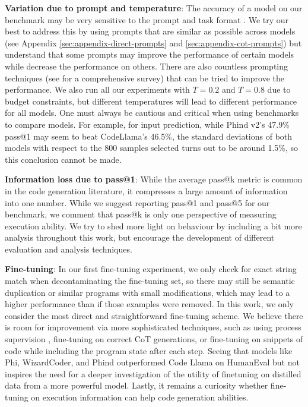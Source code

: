 \textbf{Variation due to prompt and temperature}: The accuracy of a model on our benchmark may be very sensitive to the prompt and task format \citep{mizrahi2023state}. We try our best to address this by using prompts that are similar as possible across models (see Appendix \ref{sec:appendix-direct-prompts} and \ref{sec:appendix-cot-prompts}) but understand that some prompts may improve the performance of certain models while decrease the performance on others. There are also countless prompting techniques (see \citep{liu2023pre} for a comprehensive survey) that can be tried to improve the performance. We also run all our experiments with $T=0.2$ and $T=0.8$ due to budget constraints, but different temperatures will lead to different performance for all models. One must always be cautious and critical when using benchmarks to compare models. For example, for input prediction, while Phind v2's 47.9\% pass@1 may seem to beat CodeLlama's 46.5\%, the standard deviations of both models with respect to the $800$ samples selected turns out to be around 1.5\%, so this conclusion cannot be made.

\textbf{Information loss due to pass@1}: While the average pass@k metric is common in the code generation literature, it compresses a large amount of information into one number. While we suggest reporting pass@1 and pass@5 for our benchmark, we comment that pass@k is only one perspective of measuring execution ability. We try to shed more light on behaviour by including a bit more analysis throughout this work, but encourage the development of different evaluation and analysis techniques.

\textbf{Fine-tuning}: In our first fine-tuning experiment, we only check for exact string match when decontaminating the fine-tuning set, so there may still be semantic duplication or similar programs with small modifications, which may lead to a higher performance than if those examples were removed. In this work, we only consider the most direct and straightforward fine-tuning scheme. We believe there is room for improvement via more sophisticated techniques, such as using process supervision \citep{uesato2022solving}, fine-tuning on correct CoT generations, or fine-tuning on snippets of code while including the program state after each step. Seeing that models like Phi, WizardCoder, and Phind outperformed Code Llama on HumanEval but not \benchmark inspires the need for a deeper investigation of the utility of finetuning on distilled data from a more powerful model. Lastly, it remains a curiosity whether fine-tuning on execution information can help code generation abilities.

